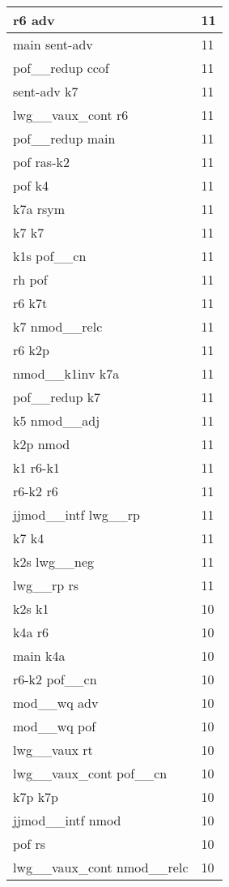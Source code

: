 \documentclass[a4 paper]{article}
\begin{document}
\begin{longtable}{p{}p{}}
r6 adv  & 11 \\ \midrule
main sent-adv  & 11 \\ \midrule
pof\_\_redup ccof  & 11 \\ \midrule
sent-adv k7  & 11 \\ \midrule
lwg\_\_vaux\_cont r6  & 11 \\ \midrule
pof\_\_redup main  & 11 \\ \midrule
pof ras-k2  & 11 \\ \midrule
pof k4  & 11 \\ \midrule
k7a rsym  & 11 \\ \midrule
k7 k7  & 11 \\ \midrule
k1s pof\_\_cn  & 11 \\ \midrule
rh pof  & 11 \\ \midrule
r6 k7t  & 11 \\ \midrule
k7 nmod\_\_relc  & 11 \\ \midrule
r6 k2p  & 11 \\ \midrule
nmod\_\_k1inv k7a  & 11 \\ \midrule
pof\_\_redup k7  & 11 \\ \midrule
k5 nmod\_\_adj  & 11 \\ \midrule
k2p nmod  & 11 \\ \midrule
k1 r6-k1  & 11 \\ \midrule
r6-k2 r6  & 11 \\ \midrule
jjmod\_\_intf lwg\_\_rp  & 11 \\ \midrule
k7 k4  & 11 \\ \midrule
k2s lwg\_\_neg  & 11 \\ \midrule
lwg\_\_rp rs  & 11 \\ \midrule
k2s k1  & 10 \\ \midrule
k4a r6  & 10 \\ \midrule
main k4a  & 10 \\ \midrule
r6-k2 pof\_\_cn  & 10 \\ \midrule
mod\_\_wq adv  & 10 \\ \midrule
mod\_\_wq pof  & 10 \\ \midrule
lwg\_\_vaux rt  & 10 \\ \midrule
lwg\_\_vaux\_cont pof\_\_cn  & 10 \\ \midrule
k7p k7p  & 10 \\ \midrule
jjmod\_\_intf nmod  & 10 \\ \midrule
pof rs  & 10 \\ \midrule
lwg\_\_vaux\_cont nmod\_\_relc  & 10 \\ \midrule

\end{longtable}
\end{document}
